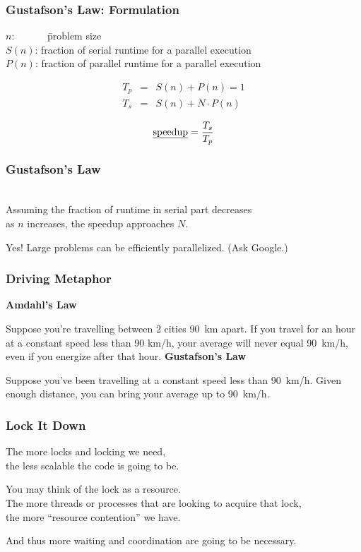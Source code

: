 \begin{frame}
  \frametitle{Gustafson's Law: Formulation}

\hspace*{2em} 
\begin{tabbing}
  $n$:~~~~~~ \= problem size\\[.1em]

  $S(n)$: \> fraction of serial runtime for a parallel execution\\[.1em]

  $P(n)$: \> fraction of parallel runtime for a parallel execution\\
\end{tabbing}


\begin{eqnarray*}
T_p &=& S(n) + P(n) = 1 \\
T_s &=& S(n) + N \cdot P(n) 
\end{eqnarray*}

\[ \mbox{\em speedup} = \frac{T_s}{T_p} \]
\end{frame}

\begin{frame}
  \frametitle{Gustafson's Law}

\hspace*{2em}
  \\[1em]

  Assuming the fraction of runtime in serial part decreases \\
  as $n$ increases,
  the speedup approaches $N$.


Yes! Large problems can be efficiently parallelized. (Ask Google.)

\end{frame}

\begin{frame}
  \frametitle{Driving Metaphor}

  {\bf Amdahl's Law}
  
  Suppose you're travelling between 2 cities 90~km apart. If you travel for an
  hour at a constant speed less than 90 km/h, your average will never equal
  90~km/h, even if you energize after that hour.
  \vfill
  {\bf Gustafson's Law}

  Suppose you've been travelling at a constant speed less than 90~km/h. Given
  enough distance, you can bring your average up to 90~km/h.
\end{frame}


\begin{frame}
\frametitle{Lock It Down}
The more locks and locking we need, \\
the less scalable the code is going to be. 

You may think of the lock as a resource. \\
The more threads or processes that are looking to acquire that lock, \\
the more ``resource contention'' we have.

And thus more waiting and coordination are going to be necessary.

\end{frame}



